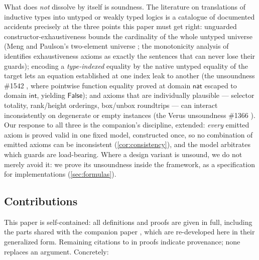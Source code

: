 What does \emph{not} dissolve by itself is soundness.  The literature on
translations of inductive types into untyped or weakly typed logics is a
catalogue of documented accidents precisely at the three points this paper
must get right: unguarded constructor-exhaustiveness bounds the
cardinality of the whole untyped universe (Meng and Paulson's two-element
universe \cite[\S 2.3]{MengPaulson2008}; the monotonicity analysis of
\cite{BlanchetteEtAl2016} identifies exhaustiveness axioms as exactly the
sentences that can never lose their guards); encoding a \emph{type-indexed}
equality by the native untyped equality of the target lets an equation
established at one index leak to another (the \fstar{} unsoundness
\#1542 \cite{FStar1542}, where pointwise function equality proved at
domain $\mathsf{nat}$ escaped to domain $\mathsf{int}$, yielding
$\mathsf{False}$); and axioms that are individually plausible ---
selector totality, rank/height orderings, box/unbox roundtrips --- can
interact inconsistently on degenerate or empty instances (the Verus
unsoundness \#1366 \cite{Verus1366}).  Our response to all three is the
companion's discipline, extended: \emph{every} emitted axiom is proved
valid in one fixed model, constructed once, so no combination of emitted
axioms can be inconsistent (\cref{cor:consistency}), and the model
arbitrates which guards are load-bearing.  Where a design variant is
unsound, we do not merely avoid it: we prove its unsoundness inside the
framework, as a specification for implementations
(\cref{sec:formulas}).

\subsection{Contributions}
\label{sec:intro-contrib}

This paper is self-contained: all definitions and proofs are given in
full, including the parts shared with the companion paper
\cite{Extraction2026}, which are re-developed here in their generalized
form.  Remaining citations to \cite{Extraction2026} in proofs indicate
provenance; none replaces an argument.  Concretely:

